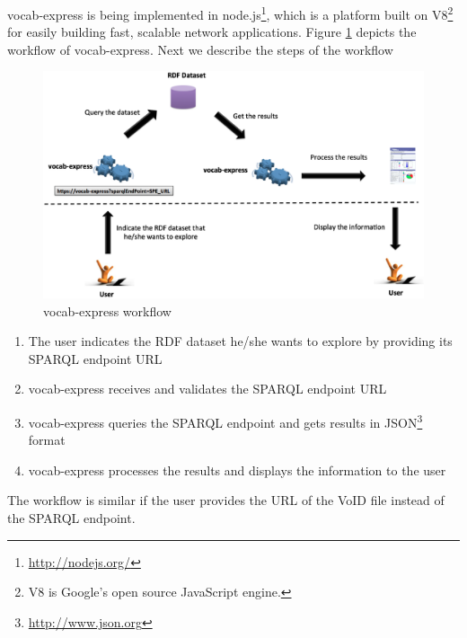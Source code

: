 vocab-express is being implemented in node.js\footnote{\footnotesize \url{http://nodejs.org/}}, which is a platform built on V8\footnote{\footnotesize V8 is Google's open source JavaScript engine.} for easily building fast, scalable network applications. 
Figure \ref{fig:workflow} depicts the workflow of vocab-express. Next we describe the steps of the workflow

\begin{figure}[hbt!p]
\begin{center}
\includegraphics[scale=0.26]{img/workflow.eps}
\end{center}
\label{fig:workflow} 
\caption{vocab-express workflow}
\end{figure}


\begin{enumerate}
	\item The user indicates the RDF dataset he/she wants to explore by providing its SPARQL endpoint URL
	\item vocab-express receives and validates the SPARQL endpoint URL
	\item vocab-express queries the SPARQL endpoint and gets results in JSON\footnote{\footnotesize \url{http://www.json.org}} format
	\item vocab-express processes the results and displays the information to the user
\end{enumerate}
The workflow is similar if the user provides the URL of the VoID file instead of the SPARQL endpoint.